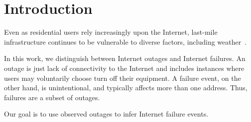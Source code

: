 \section{Introduction}

Even as residential users rely increasingly upon the Internet,
last-mile infrastructure continues to be vulnerable to diverse
factors, including weather~\cite{schulman-imc11}.

In this work, we distinguish between Internet outages and Internet
failures. An outage is just lack of connectivity to the Internet and
includes instances where users may voluntarily choose turn off their
equipment. A failure event, on the other hand, is unintentional, and
typically affects more than one address. Thus, failures are a subset
of outages.

Our goal is to use observed outages to infer Internet failure events. 